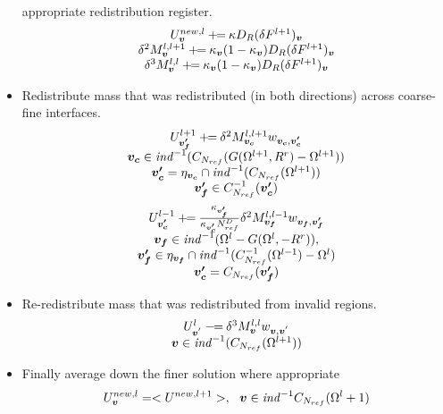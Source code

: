 \begin{itemize}
appropriate redistribution register.
\begin{equation}
\begin{array}{c}
U^{new,l}_{\boldsymbol{v}} \mathbin{+\mkern-7mu=} \kappa D_R(\delta F^{l+1})_{\boldsymbol{v}} \\
\delta^2 M^{l, l+1}_{\boldsymbol{v}} \mathbin{+\mkern-7mu=}
\kappa_{\boldsymbol{v}}(1-\kappa_{\boldsymbol{v}})D_R(\delta F^{l+1})_{\boldsymbol{v}}  \\
\delta^3 M^{l, l}_{\boldsymbol{v}} \mathbin{+\mkern-7mu=}
\kappa_{\boldsymbol{v}}(1-\kappa_{\boldsymbol{v}})D_R(\delta F^{l+1})_{\boldsymbol{v}}  
\end{array}
\label{eqn::mlredist2}
\end{equation}
\item Redistribute mass that was redistributed (in both directions)
      across coarse-fine interfaces.
\begin{equation}
\begin{array}{c}
U^{l+1}_{{\boldsymbol{v'_f}}} \mathbin{+\mkern-7mu=}  
\delta^2 M^{l,l+1}_{{\boldsymbol{v_c}}} w_{{\boldsymbol{v_c}},{\boldsymbol{v'_c}}} \\
{\boldsymbol{v_c}} \in {\it ind}^{-1}(C_{{{N}_{ref}}}(G(\Omega^{l+1}, R^r) - \Omega^{l+1})) \\
{\boldsymbol{v'_c}} = \eta_{{\boldsymbol{v_c}}} \cap {\it ind}^{-1}(C_{{{N}_{ref}}}(\Omega^{l+1})) \\
{\boldsymbol{v'_f}} \in C^{-1}_{{N}_{ref}}({\boldsymbol{v'_c}}) \\
\end{array}
\end{equation}
\begin{equation}
\begin{array}{c}
U^{l-1}_{{\boldsymbol{v'_c}}} \mathbin{+\mkern-7mu=}  
\frac{\kappa_{\boldsymbol{v'_f}}}{\kappa_{\boldsymbol{v'_c}} N^D_{ref}}  
\delta^2 M^{l,l-1}_{{\boldsymbol{v_f}}} w_{{\boldsymbol{v_f}},{\boldsymbol{v'_f}}}\\
{\boldsymbol{v_f}} \in {\it ind}^{-1}(\Omega^{l}-G(\Omega^{l}, -R^r)),\\
{\boldsymbol{v'_f}} \in \eta_{{\boldsymbol{v_f}}} \cap 
{\it ind}^{-1}(C^{-1}_{{{N}_{ref}}}(\Omega^{l-1}) - \Omega^{l}) \\
{\boldsymbol{v'_c}} = C_{{N}_{ref}}({\boldsymbol{v'_f}})
\end{array}
\end{equation}

\item Re-redistribute mass that was redistributed from invalid 
        regions.
\begin{equation}
\begin{array}{c}
U^{l}_{{\boldsymbol{v}^{'}}} \mathbin{-\mkern-7mu=}  
\delta^3 M^{l,l}_{{\boldsymbol{v}}} w_{{\boldsymbol{v}},{\boldsymbol{v}^{'}}} \\
{\boldsymbol{v}} \in {\it ind}^{-1}(C_{{N}_{ref}}(\Omega^{l+1}))
\end{array}
\end{equation}

\item Finally average down the finer solution where appropriate
\begin{equation}
U^{new,l}_{\boldsymbol{v}} = <U^{new,l+1}>, ~~{\boldsymbol{v}} \in {\it ind}^{-1}C_{{{N}_{ref}}}(\Omega^l+1)
\end{equation}

\end{itemize}

